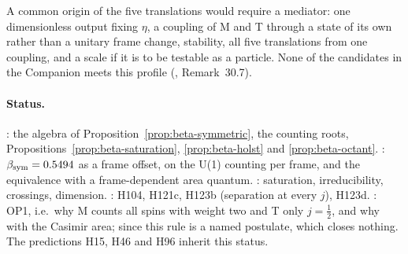A common origin of the five translations would require a mediator: one dimensionless output fixing $\eta$, a coupling of M and T through a state of
its own rather than a unitary frame change, stability, all five translations from one coupling, and a scale if it is to be testable as a particle.
None of the candidates in the Companion meets this profile (, Remark~30.7).

\paragraph{Status.}
\Established: the algebra of Proposition~\ref{prop:beta-symmetric}, the counting roots, Propositions~\ref{prop:beta-saturation},
\ref{prop:beta-holst} and \ref{prop:beta-octant}.  \Conditional: $\beta_{\mathrm{sym}}=0.5494$ as a frame offset, on the U(1) counting per frame, and the
equivalence with a frame-dependent area quantum.  \Reading: saturation, irreducibility, crossings, dimension.  \Refuted: H104, H121c, H123b (separation at every $j$), H123d.
\Open: OP1, i.e.\ why M counts all spins with weight two and T only $j=\tfrac12$, and why with the Casimir area; since  this rule is a named postulate, which closes nothing.  The predictions H15, H46 and H96 inherit this status.

